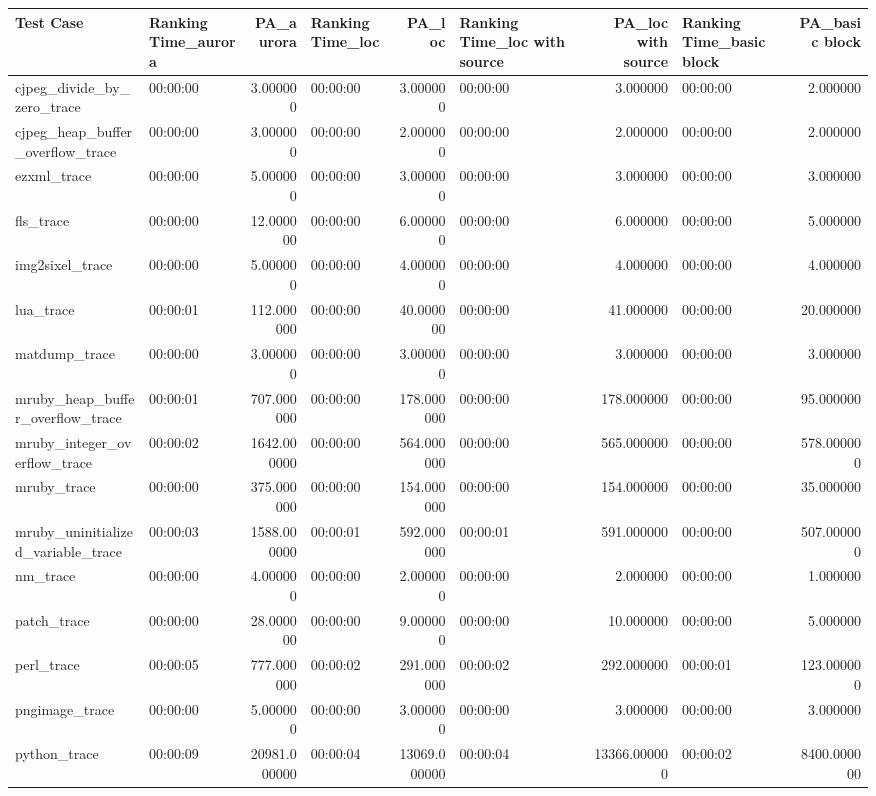 \begin{tabular}{llrlrlrlr}
\toprule
Test Case & Ranking Time_aurora & PA_aurora & Ranking Time_loc & PA_loc & Ranking Time_loc with source & PA_loc with source & Ranking Time_basic block & PA_basic block \\
\midrule
cjpeg_divide_by_zero_trace & 00:00:00 & 3.000000 & 00:00:00 & 3.000000 & 00:00:00 & 3.000000 & 00:00:00 & 2.000000 \\
cjpeg_heap_buffer_overflow_trace & 00:00:00 & 3.000000 & 00:00:00 & 2.000000 & 00:00:00 & 2.000000 & 00:00:00 & 2.000000 \\
ezxml_trace & 00:00:00 & 5.000000 & 00:00:00 & 3.000000 & 00:00:00 & 3.000000 & 00:00:00 & 3.000000 \\
fls_trace & 00:00:00 & 12.000000 & 00:00:00 & 6.000000 & 00:00:00 & 6.000000 & 00:00:00 & 5.000000 \\
img2sixel_trace & 00:00:00 & 5.000000 & 00:00:00 & 4.000000 & 00:00:00 & 4.000000 & 00:00:00 & 4.000000 \\
lua_trace & 00:00:01 & 112.000000 & 00:00:00 & 40.000000 & 00:00:00 & 41.000000 & 00:00:00 & 20.000000 \\
matdump_trace & 00:00:00 & 3.000000 & 00:00:00 & 3.000000 & 00:00:00 & 3.000000 & 00:00:00 & 3.000000 \\
mruby_heap_buffer_overflow_trace & 00:00:01 & 707.000000 & 00:00:00 & 178.000000 & 00:00:00 & 178.000000 & 00:00:00 & 95.000000 \\
mruby_integer_overflow_trace & 00:00:02 & 1642.000000 & 00:00:00 & 564.000000 & 00:00:00 & 565.000000 & 00:00:00 & 578.000000 \\
mruby_trace & 00:00:00 & 375.000000 & 00:00:00 & 154.000000 & 00:00:00 & 154.000000 & 00:00:00 & 35.000000 \\
mruby_uninitialized_variable_trace & 00:00:03 & 1588.000000 & 00:00:01 & 592.000000 & 00:00:01 & 591.000000 & 00:00:00 & 507.000000 \\
nm_trace & 00:00:00 & 4.000000 & 00:00:00 & 2.000000 & 00:00:00 & 2.000000 & 00:00:00 & 1.000000 \\
patch_trace & 00:00:00 & 28.000000 & 00:00:00 & 9.000000 & 00:00:00 & 10.000000 & 00:00:00 & 5.000000 \\
perl_trace & 00:00:05 & 777.000000 & 00:00:02 & 291.000000 & 00:00:02 & 292.000000 & 00:00:01 & 123.000000 \\
pngimage_trace & 00:00:00 & 5.000000 & 00:00:00 & 3.000000 & 00:00:00 & 3.000000 & 00:00:00 & 3.000000 \\
python_trace & 00:00:09 & 20981.000000 & 00:00:04 & 13069.000000 & 00:00:04 & 13366.000000 & 00:00:02 & 8400.000000 \\

\end{tabular}
